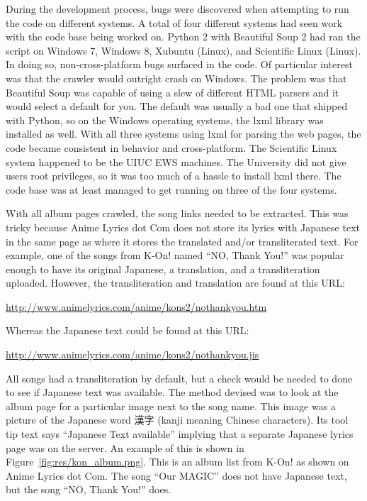 \documentclass{acm} %
\begin{document}
\begin{CJK}{UTF8}{zhsong}
During the development process, bugs were discovered when attempting to run the code on different systems. A total of four different systems had seen work with the code base being worked on. Python 2 with Beautiful Soup 2 had ran the script on Windows 7, Windows 8, Xubuntu (Linux), and Scientific Linux (Linux). In doing so, non-cross-platform bugs surfaced in the code. Of particular interest was that the crawler would outright crash on Windows. The problem was that Beautiful Soup was capable of using a slew of different HTML parsers and it would select a default for you. The default was usually a bad one that shipped with Python, so on the Windows operating systems, the lxml library was installed as well. With all three systems using lxml for parsing the web pages, the code became consistent in behavior and cross-platform. The Scientific Linux system happened to be the UIUC EWS machines. The University did not give users root privileges, so it was too much of a hassle to install lxml there. The code base was at least managed to get running on three of the four systems.

With all album pages crawled, the song links needed to be extracted. This was tricky because Anime Lyrics dot Com does not store its lyrics with Japanese text in the same page as where it stores the translated and/or transliterated text. For example, one of the songs from K-On! named ``NO, Thank You!'' was popular enough to have its original Japanese, a translation, and a transliteration uploaded. However, the transliteration and translation are found at this URL:

\url{http://www.animelyrics.com/anime/kons2/nothankyou.htm}

Whereas the Japanese text could be found at this URL:

\url{http://www.animelyrics.com/anime/kons2/nothankyou.jis}

All songs had a transliteration by default, but a check would be needed to done to see if Japanese text was available. The method devised was to look at the album page for a particular image next to the song name. This image was a picture of the Japanese word 漢字 (kanji meaning Chinese characters). Its tool tip text says ``Japanese Text available'' implying that a separate Japanese lyrics page was on the server. An example of this is shown in Figure~\ref{fig:res/kon_album.png}. This is an album list from K-On! as shown on Anime Lyrics dot Com. The song ``Our MAGIC'' does not have Japanese text, but the song ``NO, Thank You!'' does.


\end{CJK}
\end{document}
